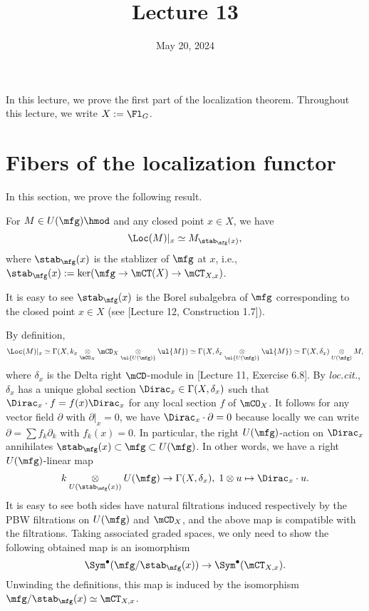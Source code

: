 





\title{Lecture 13}

\date{May 20, 2024}

\maketitle

	In this lecture, we prove the first part of the localization theorem. Throughout this lecture, we write $X:=\Fl_G$.

\section{Fibers of the localization functor}

	In this section, we prove the following result.

		\begin{prop}
		\label{prop-fiber-localization}
		For $M \in U(\mfg)\hmod$ and any closed point $x\in X$, we have
		\[
			\Loc(M)|_x \simeq M_{\stab_\mfg(x)},
		\]
		where $\stab_\mfg(x)$ is the stablizer of $\mfg$ at $x$, i.e., $\stab_\mfg(x):=\ker( \mfg \to \mCT(X) \to \mCT_{X,x}  )$.
	\end{prop}

	\begin{rem}
		It is easy to see $\stab_\mfg(x)$ is the Borel subalgebra of $\mfg$ corresponding to the closed point $x\in X$ (see [Lecture 12, Construction 1.7]).
	\end{rem}

	\proof
		By definition,
		\[
			\Loc(M)|_x \simeq \Gamma(X,k_x \ot_{\mCO_{X}} \mCD_{X} \ot_{\ul{U(\mfg)}} \ul{M}) \simeq \Gamma(X, \delta_x \ot_{ \ul{U(\mfg)} } \ul{M}) \simeq \Gamma(X,\delta_x) \ot_{ U(\mfg) } M,
		\]
		where $\delta_x$ is the Delta right $\mCD$-module in [Lecture 11, Exercise 6.8]. By \emph{loc.cit.}, $\delta_x$ has a unique global section $\Dirac_x\in  \Gamma(X,\delta_x)$ such that $\Dirac_x \cdot f = f(x)\Dirac_x$ for any local section $f$ of $\mCO_{X}$. It follows for any vector field $\partial$ with $\partial|_x =0$, we have $\Dirac_x \cdot \partial = 0$ because locally we can write $\partial=\sum f_k \partial_k$ with $f_k(x)=0$. In particular, the right $U(\mfg)$-action on $\Dirac_x$ annihilates $\stab_\mfg(x) \subset \mfg \subset U(\mfg)$. In other words, we have a right $U(\mfg)$-linear map
		\[
			k\ot_{U(\stab_\mfg(x))} U(\mfg) \to \Gamma(X, \delta_x ),\; 1\ot u \mapsto \Dirac_x \cdot u. 
		\]
		It is easy to see both sides have natural filtrations induced respectively by the PBW filtrations on $U(\mfg)$ and $\mCD_{X}$, and the above map is compatible with the filtrations. Taking associated graded spaces, we only need to show the following obtained map is an isomorphism
		\[
			\Sym^\bullet( \mfg/\stab_\mfg(x) ) \to \Sym^\bullet(\mCT_{X,x}).
		\]
		Unwinding the definitions, this map is induced by the isomorphism $\mfg/\stab_\mfg(x) \simeq \mCT_{X,x}$.


